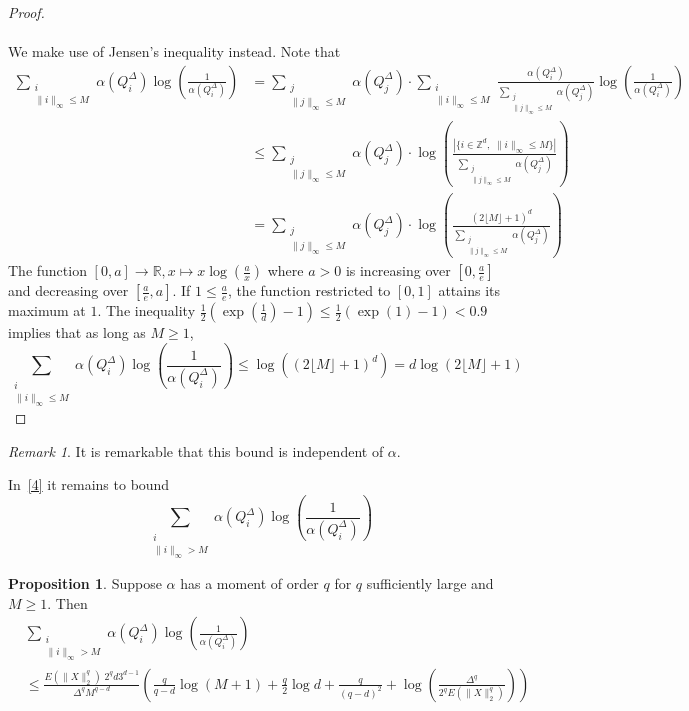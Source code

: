 \documentclass[12pt]{report}
\theoremstyle{definition}
\newtheorem{prop}[defi]{Proposition}
\theoremstyle{remark}
\newtheorem{rem}[defi]{Remark}
\begin{document}
\begin{proof}
\\
\\
We make use of Jensen's inequality instead. Note that 
$$\begin{aligned}
\sum_{\substack{i\\ \|i\|_\infty\leq M}} \alpha(Q_i^\Delta)\log\left(\frac{1}{\alpha(Q_i^\Delta)}\right) 
&= \sum_{\substack{j\\ \|j\|_\infty\leq M}} \alpha(Q_j^\Delta) \cdot  \sum_{\substack{i\\ \|i\|_\infty\leq M}} \frac{\alpha(Q_i^\Delta)}{
\sum \limits_{\substack{j\\ \|j\|_\infty\leq M}} \alpha(Q_j^\Delta)
}\log\left(\frac{1}{\alpha(Q_i^\Delta)}\right) \\ 
&\leq \sum_{\substack{j\\ \|j\|_\infty\leq M}} \alpha(Q_j^\Delta) \cdot \log\left(\frac{|\{i\in \mathbb Z^d,\; \|i\|_\infty\leq M \}|}{\sum \limits_{\substack{j\\ \|j\|_\infty\leq M}} \alpha(Q_j^\Delta)}\right)\\
&= \sum_{\substack{j\\ \|j\|_\infty\leq M}} \alpha(Q_j^\Delta) \cdot \log\left(\frac{(2\lfloor M \rfloor + 1)^d}{\sum \limits_{\substack{j\\ \|j\|_\infty\leq M}} \alpha(Q_j^\Delta)}\right)
\end{aligned}
$$
The function $[0,a]\to \mathbb R, x\mapsto x \log\left(\frac{a}{x} \right)$ where $a>0$ is increasing over $[0, \frac ae]$ and decreasing over $[\frac ae , a]$. If $1\leq \frac ae$, the function restricted to $[0,1]$ attains its maximum at $1$. The inequality $\frac 12 \left(\exp(\frac 1d)-1 \right)\leq \frac 12 \left(\exp(1)-1 \right)<0.9$ implies that as long as $M\geq 1$, 
$$\sum_{\substack{i\\ \|i\|_\infty\leq M}} \alpha(Q_i^\Delta)\log\left(\frac{1}{\alpha(Q_i^\Delta)}\right) \leq \log((2\lfloor M \rfloor + 1)^d) = d\log(2\lfloor M \rfloor + 1)$$
\end{proof}

\begin{rem}
It is remarkable that this bound is independent of $\alpha$.
\end{rem}

In~\eqref{4} it remains to bound $$\sum_{\substack{i\\ \|i\|_\infty > M}} \alpha(Q_i^\Delta)\log\left(\frac{1}{\alpha(Q_i^\Delta)}\right)$$

\begin{prop}
	Suppose $\alpha$ has a moment of order $q$ for $q$ sufficiently large and $M\geq 1$. Then 
\begin{align*}
&\sum_{\substack{i\\ \|i\|_\infty > M}} \alpha(Q_i^\Delta)\log\left(\frac{1}{\alpha(Q_i^\Delta)}\right)\\
&\leq 
\frac{E(\|X\|_2^q)\; 2^q d 3^{d-1}}{\Delta^qM^{q-d}}
\left(
\frac{q}{q-d} \log(M+1) + \frac{q}{2} \log d + \frac{q}{(q-d)^2} + \log\left(\frac{\Delta^q}{2^q E(\|X\|_2^q)} \right)
\right) 
\end{align*}
\end{prop}
\end{document}
